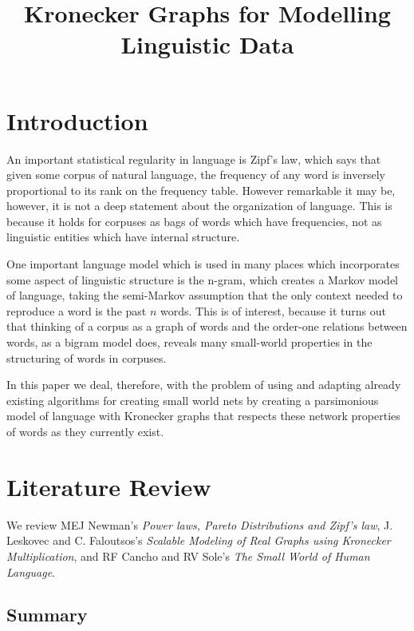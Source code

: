 \documentclass[12pt]{article}
\begin{document}
\title{Kronecker Graphs for Modelling Linguistic Data}

\section{Introduction}

An important statistical regularity in language is Zipf's law, which says that given some corpus of natural language, the frequency of any word is inversely proportional to its rank on the frequency table. However remarkable it may be, however, it is not a deep statement about the organization of language. This is because it holds for corpuses as bags of words which have frequencies, not as linguistic entities which have internal structure. %

One important language model which is used in many places which incorporates some aspect of linguistic structure is the n-gram, which creates a Markov model of language, taking the semi-Markov assumption that the only context needed to reproduce a word is the past $n$ words. This is of interest, because it turns out that thinking of a corpus as a graph of words and the order-one relations between words, as a bigram model does, reveals many small-world properties in the structuring of words in corpuses. %

In this paper we deal, therefore, with the problem of using and adapting already existing algorithms for creating small world nets by creating a parsimonious model of language with Kronecker graphs that respects these network properties of words as they currently exist.

\section{Literature Review}

We review MEJ Newman's \emph{Power laws, Pareto Distributions and Zipf's law}, J. Leskovec and C. Faloutsos's \emph{Scalable Modeling of Real Graphs using Kronecker Multiplication}, and RF Cancho and RV Sole's \emph{The Small World of Human Language}. %


\subsection{Summary}
\end{document}
